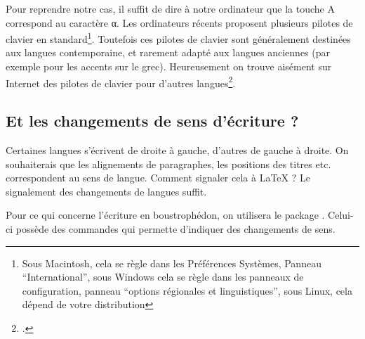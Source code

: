 Pour reprendre notre cas, il suffit de dire à notre ordinateur que la touche A correspond au caractère α. Les ordinateurs récents proposent plusieurs pilotes de clavier en standard\footnote{Sous Macintosh, cela se règle dans les Préférences Systèmes, Panneau \enquote{International}, sous Windows cela se règle dans les panneaux de configuration, panneau \enquote{options régionales et linguistiques}, sous Linux, cela dépend de votre distribution}. Toutefois ces pilotes de clavier sont généralement destinées aux langues contemporaine, et rarement adapté aux langues anciennes (par exemple pour les accents sur le grec). Heureusement on trouve aisément sur Internet des pilotes de clavier pour d'autres langues\footcite[Pour ce qui concerne le grec ancien, le syriaque, l'hébreu ancien, on pourra utiliser les claviers proposés par Michel Langlois][]{clavierLanglois}.


\subsection{Et les changements de sens d'écriture ?}

Certaines langues s'écrivent de droite à gauche, d'autres de gauche à droite. On souhaiterais que les alignements de paragraphes, les positions des titres etc. correspondent au sens de langue. 
Comment signaler cela à LaTeX ? Le signalement des changements de langues suffit.

Pour ce qui concerne l'écriture en boustrophédon, on utilisera le package . Celui-ci possède des  commandes qui permette d'indiquer des changements de sens. 

